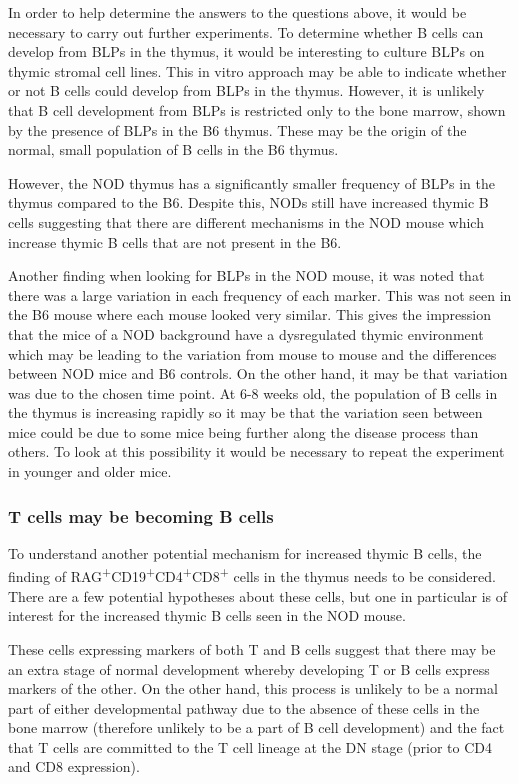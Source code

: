 In order to help determine the answers to the questions above, it would be necessary to carry out further experiments.
To determine whether B cells can develop from BLPs in the thymus, it would be interesting to culture BLPs on thymic stromal cell lines.
This in vitro approach may be able to indicate whether or not B cells could develop from BLPs in the thymus.
However, it is unlikely that B cell development from BLPs is restricted only to the bone marrow, shown by the presence of BLPs in the B6 thymus.
These may be the origin of the normal, small population of B cells in the B6 thymus.

However, the NOD thymus has a significantly smaller frequency of BLPs in the thymus compared to the B6.
Despite this, NODs still have increased thymic B cells suggesting that there are different mechanisms in the NOD mouse which increase thymic B cells that are not present in the B6.

Another finding when looking for BLPs in the NOD mouse, it was noted that there was a large variation in each frequency of each marker.
This was not seen in the B6 mouse where each mouse looked very similar.
This gives the impression that the mice of a NOD background have a dysregulated thymic environment which may be leading to the variation from mouse to mouse and the differences between NOD mice and B6 controls.
On the other hand, it may be that variation was due to the chosen time point. 
At 6-8 weeks old, the population of B cells in the thymus is increasing rapidly so it may be that the variation seen between mice could be due to some mice being further along the disease process than others.
To look at this possibility it would be necessary to repeat the experiment in younger and older mice.

\subsubsection{T cells may be becoming B cells}

To understand another potential mechanism for increased thymic B cells, the finding of RAG\textsuperscript{+}CD19\textsuperscript{+}CD4\textsuperscript{+}CD8\textsuperscript{+} cells in the thymus needs to be considered.
There are a few potential hypotheses about these cells, but one in particular is of interest for the increased thymic B cells seen in the NOD mouse.

These cells expressing markers of both T and B cells suggest that there may be an extra stage of normal development whereby developing T or B cells express markers of the other.
On the other hand, this process is unlikely to be a normal part of either developmental pathway due to the absence of these cells in the bone marrow (therefore unlikely to be a part of B cell development) and the fact that T cells are committed to the T cell lineage at the DN stage (prior to CD4 and CD8 expression).

